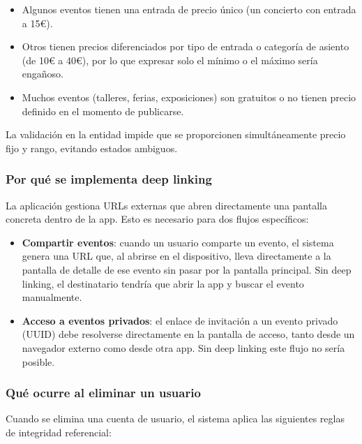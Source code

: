 \begin{itemize}
    \item Algunos eventos tienen una entrada de precio único (un concierto con entrada a 15€).
    \item Otros tienen precios diferenciados por tipo de entrada o categoría de asiento (de 10€ a 40€), por lo que expresar solo el mínimo o el máximo sería engañoso.
    \item Muchos eventos (talleres, ferias, exposiciones) son gratuitos o no tienen precio definido en el momento de publicarse.
\end{itemize}

La validación en la entidad impide que se proporcionen simultáneamente precio fijo y rango, evitando estados ambiguos.

\subsubsection{Por qué se implementa deep linking}

La aplicación gestiona URLs externas que abren directamente una pantalla concreta dentro de la app. Esto es necesario para dos flujos específicos:

\begin{itemize}
    \item \textbf{Compartir eventos}: cuando un usuario comparte un evento, el sistema genera una URL que, al abrirse en el dispositivo, lleva directamente a la pantalla de detalle de ese evento sin pasar por la pantalla principal. Sin deep linking, el destinatario tendría que abrir la app y buscar el evento manualmente.
    \item \textbf{Acceso a eventos privados}: el enlace de invitación a un evento privado (UUID) debe resolverse directamente en la pantalla de acceso, tanto desde un navegador externo como desde otra app. Sin deep linking este flujo no sería posible.
\end{itemize}

\subsubsection{Qué ocurre al eliminar un usuario}

Cuando se elimina una cuenta de usuario, el sistema aplica las siguientes reglas de integridad referencial:

